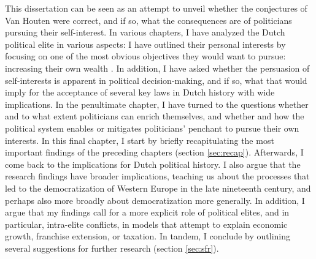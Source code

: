 This dissertation can be seen as an attempt to unveil whether the conjectures of Van Houten were correct, and if so, what the consequences are of politicians pursuing their self-interest. In various chapters, I have analyzed the Dutch political elite in various aspects: I have outlined their personal interests by focusing on one of the most obvious objectives they would want to pursue: increasing their own wealth \citep{buchanan1989essays}. In addition, I have asked whether the persuasion of self-interests is apparent in political decision-making, and if so, what that would imply for the acceptance of several key laws in Dutch history with wide implications. In the penultimate chapter, I have turned to the questions whether and to what extent politicians can enrich themselves, and whether and how the political system enables or mitigates politicians' penchant to pursue their own interests. In this final chapter, I start by briefly recapitulating the most important findings of the preceding chapters (section \ref{sec:recap}). Afterwards, I come back to the implications for Dutch political history. I also argue that the research findings have broader implications, teaching us about the processes that led to the democratization of Western Europe in the late nineteenth century, and perhaps also more broadly about democratization more generally. In addition, I argue that my findings call for a more explicit role of political elites, and in particular, intra-elite conflicts, in models that attempt to explain economic growth, franchise extension, or taxation. In tandem, I conclude by outlining several suggestions for further research (section \ref{sec:sfr}). 




